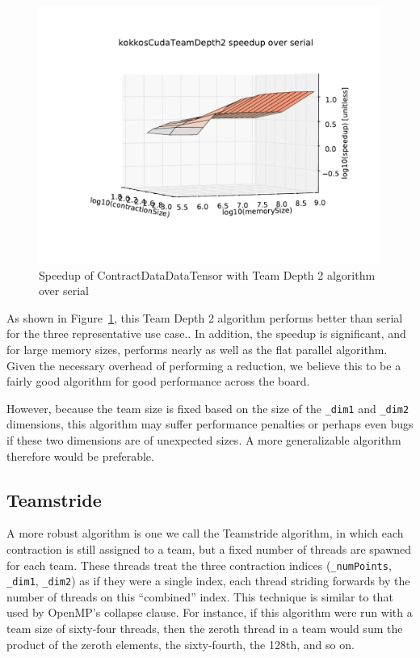 \begin{figure}[ht]
    \includegraphics[scale=.55]{./VersusSerial_kokkosCudaTeamDepth2_clearCache_shadowfax.pdf}
\caption{Speedup of ContractDataDataTensor with Team Depth 2 algorithm over
    serial
\label{fig:ContractDataDataTensorDepth2}} 
\end{figure}

As shown in Figure~\ref{fig:ContractDataDataTensorDepth2}, this Team Depth 2
algorithm performs better than serial for the three representative use case..
In addition, the speedup is significant, and for large memory sizes, performs
nearly as well as the flat parallel algorithm.  Given the necessary overhead of
performing a reduction, we believe this to be a fairly good algorithm for good
performance across the
board.

However, because the team size is fixed based on the size of the \texttt{\_dim1}
and \texttt{\_dim2} dimensions, this algorithm may suffer performance penalties
or perhaps even bugs if these two dimensions are of unexpected sizes.  A more
generalizable algorithm therefore would be preferable.

\subsection{Teamstride}
    A more robust algorithm is one we call the Teamstride algorithm, in which
    each contraction is still assigned to a team, but a fixed number of threads
    are spawned for each team.  These threads treat the three contraction
    indices (\texttt{\_numPoints}, \texttt{\_dim1}, \texttt{\_dim2}) as if they were
    a single index, each thread striding forwards by the number of threads on
    this ``combined'' index.  This technique is similar to that used by OpenMP's
    collapse clause.  For instance, if this algorithm were run with a team size
    of sixty-four threads, then the zeroth thread in a team would sum the
    product of the zeroth elements, the sixty-fourth, the 128th, and so on.
    
